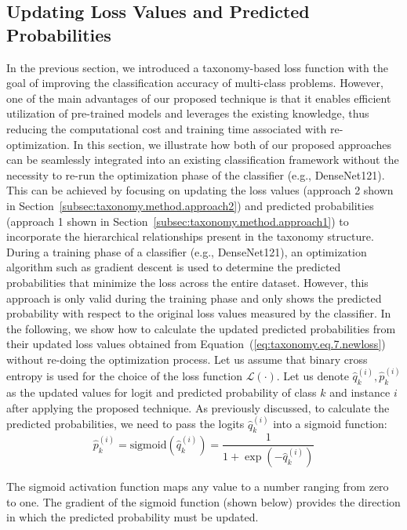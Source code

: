 \documentclass[review,1p,times,numbers]{elsarticle}
\begin{document}
\subsection{Updating Loss Values and Predicted Probabilities}\label{subsec:updating-loss-values-and-predicted-probabilities}
In the previous section, we introduced a taxonomy-based loss function with the goal of improving the classification accuracy of multi-class problems. However, one of the main advantages of our proposed technique is that it enables efficient utilization of pre-trained models and leverages the existing knowledge, thus reducing the computational cost and training time associated with re-optimization. In this section, we illustrate how both of our proposed approaches can be seamlessly integrated into an existing classification framework without the necessity to re-run the optimization phase of the classifier (e.g., DenseNet121). This can be achieved by focusing on updating the loss values (approach 2 shown in Section~\ref{subsec:taxonomy.method.approach2}) and predicted probabilities (approach 1 shown in Section~\ref{subsec:taxonomy.method.approach1}) to incorporate the hierarchical relationships present in the taxonomy structure.
During a training phase of a classifier (e.g., DenseNet121), an optimization algorithm such as gradient descent is used to determine the predicted probabilities that minimize the loss across the entire dataset. However, this approach is only valid during the training phase and only shows the predicted probability with respect to the original loss values measured by the classifier.
In the following, we show how to calculate the updated predicted probabilities from their updated loss values obtained from Equation~(\ref{eq:taxonomy.eq.7.newloss}) without re-doing the optimization process. Let us assume that binary cross entropy is used for the choice of the loss function $\mathcal{L}(\cdot) $. Let us denote $\widehat{q}_k^{(i)}, \widehat{p}_k^{(i)} $ as the updated values for logit and predicted probability of class $k $ and instance $i $ after applying the proposed technique. As previously discussed, to calculate the predicted probabilities, we need to pass the logits ${\widehat q}_k^{(i)} $ into a sigmoid function:
\begin{equation}
    \label{eq:taxonomy.eq.9.sigmoid}
    \widehat{p}_k^{(i)}=\text{sigmoid}\left(\widehat{q}_k^{(i)}\right)=\frac1{1+\exp\left(-\widehat{q}_k^{(i)}\right)}
\end{equation}

The sigmoid activation function maps any value to a number ranging from zero to one. The gradient of the sigmoid function (shown below) provides the direction in which the predicted probability must be updated.
\end{document}
